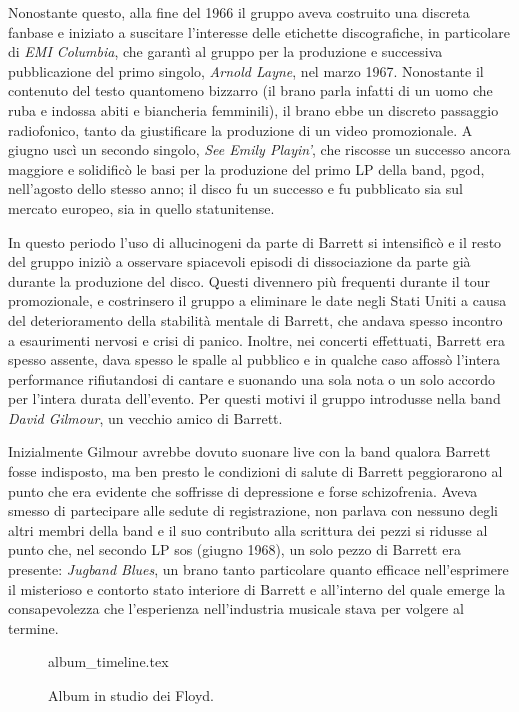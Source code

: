 \documentclass[class=book, crop=false, oneside, 12pt]{standalone}
\begin{document}
    Nonostante questo, alla fine del 1966 il gruppo aveva costruito una discreta fanbase e iniziato a suscitare l'interesse delle etichette discografiche, in particolare di \emph{EMI Columbia}, che garantì al gruppo  per la produzione e successiva pubblicazione del primo singolo, \emph{Arnold Layne}, nel marzo 1967. Nonostante il contenuto del testo quantomeno bizzarro (il brano parla infatti di un uomo che ruba e indossa abiti e biancheria femminili), il brano ebbe un discreto passaggio radiofonico, tanto da giustificare la produzione di un video promozionale. A giugno uscì un secondo singolo, \emph{See  Emily Playin'}, che riscosse un successo ancora maggiore e solidificò le basi per la produzione del primo LP della band, \acrfull{pgod}, nell'agosto dello stesso anno; il disco fu un successo e fu pubblicato sia sul mercato europeo, sia in quello statunitense. 
    
    In questo periodo l'uso di allucinogeni da parte di Barrett si intensificò e il resto del gruppo iniziò a osservare spiacevoli episodi di dissociazione da parte già durante la produzione del disco. Questi divennero più frequenti durante il tour promozionale, e costrinsero il gruppo a eliminare le date negli Stati Uniti a causa del deterioramento della stabilità mentale di Barrett, che andava spesso incontro a esaurimenti nervosi e crisi di panico. Inoltre, nei concerti effettuati, Barrett era spesso assente, dava spesso le spalle al pubblico e in qualche caso affossò l'intera performance rifiutandosi di cantare e suonando una sola nota o un solo accordo per l'intera durata dell'evento. Per questi motivi il gruppo introdusse nella band \emph{David Gilmour}, un vecchio amico di Barrett. 

    
    Inizialmente Gilmour avrebbe dovuto suonare live con la band qualora Barrett fosse indisposto, ma ben presto le condizioni di salute di Barrett peggiorarono al punto che era evidente che soffrisse di depressione e forse schizofrenia. Aveva smesso di partecipare alle sedute di registrazione, non parlava con nessuno degli altri membri della band e il suo contributo alla scrittura dei pezzi si ridusse al punto che, nel secondo LP \acrfull{sos} (giugno 1968), un solo pezzo di Barrett era presente: \emph{Jugband Blues}, un brano tanto particolare quanto efficace nell'esprimere il misterioso e contorto stato interiore di Barrett e all'interno del quale emerge la consapevolezza che l'esperienza nell'industria musicale stava per volgere al termine.

    \begin{wrapfigure}{l}{.45\textwidth}
        \centering
        {album_timeline.tex}
        \label{fig:album_timeline}
        \caption{Album in studio dei Floyd.}
    \end{wrapfigure}
\end{document}
